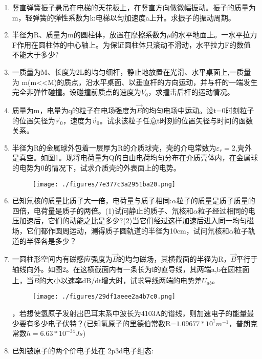 
\begin{enumerate}
\item 竖直弹簧振子悬吊在电梯的天花板上，在竖直方向做微幅振动。振子的质量为m，轻弹簧的弹性系数为k:电梯以匀加速度a上升。求振子的振动周期。
\item 半径为R、质量为m的圆柱体，放置在摩擦系数为$\mu$的水平地面上。一水平拉力F作用在圆柱体的中心轴上。为保证圆柱体只滚动不滑动，水平拉力F的数值不能大于多少?
\item 一质量为M、长度为2L的均匀细杆，静止地放置在光滑、水平桌面上,一质量为 m(m<<M)的质点，沿水平桌面、以垂直杆的方向运动，并与杆的一端发生完全非弹性碰撞。设碰撞前质点的速度为$V_0$，求撞击后杆的运动情况。
\item 质量为m，电量为q的粒子在电场强度为$\vec E$的均匀电场中运动。设t=0时刻粒子的位置矢径为$\vec r_0$，速度为$\vec v_0$。试求该粒子任意t时刻的位置矢径与时间的函数关系。
\item 半径为R的金属球外包着一层厚为R的介质球壳，壳的介电常数为$\varepsilon_r=2$,壳外是真空。如图1。现将电荷量为Q的自由电荷均匀分布在介质壳体内，在金属球的电势为0的情况下，试求介质壳的外表面上的电势。
\begin{figure}[ht]
\centering
\texttt{[image: ./figures/7e377c3a2951ba20.png]}
\caption{} \label{fig_SSD04_1}
\end{figure}
\item 已知氘核的质量比质子大一倍，电荷量与质子相同:$\alpha$粒子的质量是质子质量的四倍，电荷量是质子的两倍。(1)试问静止的质子、氘核和$\alpha$粒子经过相同的电压加速后，它们的动能之比是多少?(2)当它们经过这样加速后进入同一均匀磁场，它们都作圆周运动，测得质子圆轨道的半径为10cm，试问氘核和$\alpha$粒子轨道的半径各是多少？
\item 一圆柱形空间内有磁感应强度为$\vec B$的均匀磁场，其横截面的半径为R，$\vec B$平行于轴线向外。如图2。在这横截面内有一条长为l的直导线，其两端a,b在圆柱面上，当$\vec B$的大小以速率dB/dt增大时，试求导线两端的电势差$U_{ab}$。
\begin{figure}[ht]
\centering
\texttt{[image: ./figures/29df1aeee2a4b7c0.png]}
\caption{} \label{fig_SSD04_2}
\end{figure}
，若想使氢原子发射出巴耳末系中波长为4103A的谱线，则加速电子的能量最少要有多少电子伏特？(已知氢原子的里德伯常数R=$1.09677*10^7 m^{-1}$，普朗克常数$h=6.63*10^{-34}Js $)
\item 已知铍原子的两个价电子处在 2p3d电子组态:\\

\end{enumerate}
